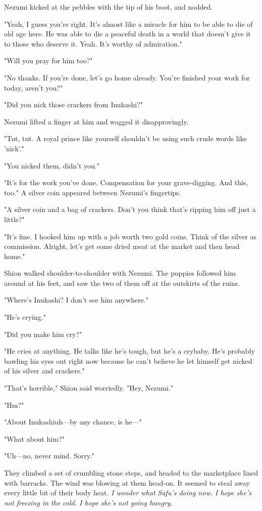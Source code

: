 Nezumi kicked at the pebbles with the tip of his boot, and nodded.

"Yeah, I guess you're right. It's almost like a miracle for him to be
able to die of old age here. He was able to die a peaceful death in a
world that doesn't give it to those who deserve it. Yeah. It's worthy of
admiration."

"Will you pray for him too?"

"No thanks. If you're done, let's go home already. You're finished your
work for today, aren't you?"

"Did you nick those crackers from Inukashi?"

Nezumi lifted a finger at him and wagged it disapprovingly.

"Tut, tut. A royal prince like yourself shouldn't be using such crude
words like 'nick'."

"You nicked them, didn't you."

"It's for the work you've done. Compensation for your grave-digging. And
this, too." A silver coin appeared between Nezumi's fingertips.

"A silver coin and a bag of crackers. Don't you think that's ripping him
off just a little?"

"It's fine. I hooked him up with a job worth two gold coins. Think of
the silver as commission. Alright, let's get some dried meat at the
market and then head home."

Shion walked shoulder-to-shoulder with Nezumi. The puppies followed him
around at his feet, and saw the two of them off at the outskirts of the
ruins.

"Where's Inukashi? I don't see him anywhere."

"He's crying."

"Did you make him cry?"

"He cries at anything. He talks like he's tough, but he's a crybaby.
He's probably bawling his eyes out right now because he can't believe he
let himself get nicked of his silver and crackers."

"That's horrible," Shion said worriedly. "Hey, Nezumi."

"Hm?"

"About Inukashi\el uh---by any chance, is he---"

"What about him?"

"Uh---no, never mind. Sorry."

They climbed a set of crumbling stone steps, and headed to the
marketplace lined with barracks. The wind was blowing at them head-on.
It seemed to steal away every little bit of their body heat. \emph{I wonder
what Safu's doing now. I hope she's not freezing in the cold. I hope
she's not going hungry.}

